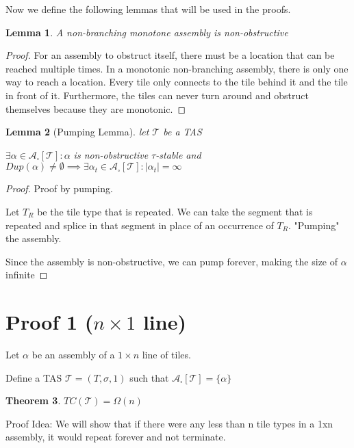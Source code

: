\documentclass[12pt]{article}
\newtheorem{theorem}{Theorem}
\newtheorem{lemma}[theorem]{Lemma}
\begin{document}
Now we define the following lemmas that will be used in the proofs.

\begin{lemma}
    A non-branching monotone assembly is non-obstructive
\end{lemma}

\begin{proof}
    For an assembly to obstruct itself, there must be a location that can be reached multiple times. In a monotonic non-branching assembly, there is only one way to reach a location. Every tile only connects to the tile behind it and the tile in front of it. Furthermore, the tiles can never turn around and obstruct themselves because they are monotonic.
\end{proof}


\begin{lemma}[Pumping Lemma] 

    let $\mathcal{T}$ be a TAS

    $\exists \alpha \in \mathcal{A}_\square[\mathcal{T}] : \alpha$ is non-obstructive $\tau$-stable and $Dup(\alpha) \ne \emptyset \implies \exists \alpha_t \in \mathcal{A}_\square[\mathcal{T}] : |\alpha_t| = \infty$
\end{lemma}

\begin{proof}
    Proof by pumping. 

    Let $T_R$ be the tile type that is repeated. We can take the segment that is repeated and splice in that segment in place of an occurrence of $T_R$. "Pumping" the assembly. 

    Since the assembly is non-obstructive, we can pump forever, making the size of $\alpha$ infinite 
\end{proof}

\section*{Proof 1 ($n \times 1 $ line)}

Let $\alpha$ be an assembly of a $1 \times n$ line of tiles.

Define a TAS $\mathcal{T} = (T, \sigma, 1)$ such that $\mathcal{A}_\square[\mathcal{T}] = \{ \alpha \}$

\begin{theorem}
	$TC(\mathcal{T}) = \Omega(n)$
\end{theorem}

Proof Idea:  We will show that if there were any less than n tile types in a 1xn assembly, it would repeat forever and not terminate.
\end{document}
